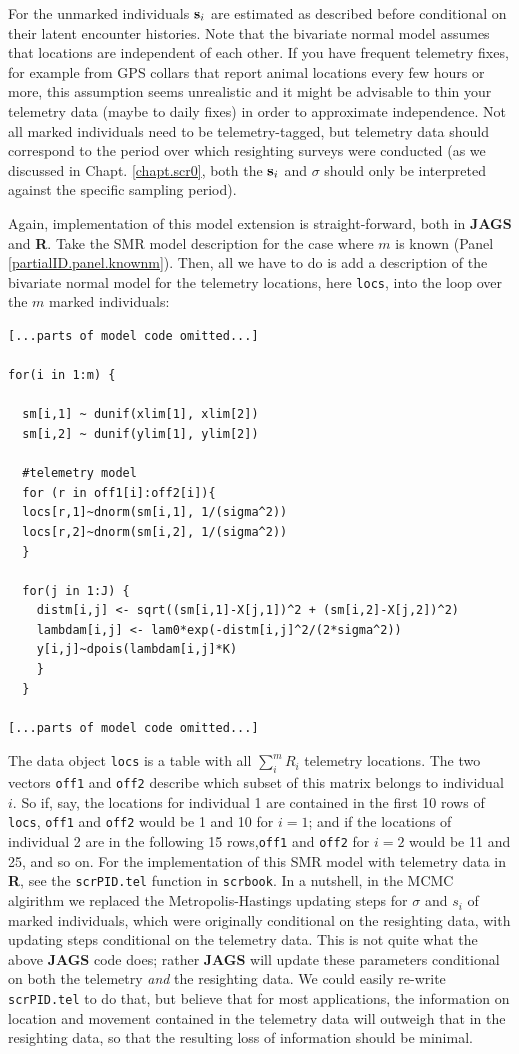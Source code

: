 For the unmarked individuals
${\bf s}_{i}$ are estimated as described before conditional on their
latent encounter histories.
Note that the bivariate normal model assumes that locations are independent of each other. If you have frequent telemetry fixes, for example from GPS collars that report animal locations every few hours or more, this assumption seems unrealistic and it might be advisable to thin your telemetry data (maybe to daily fixes) in order to approximate independence. Not all marked individuals need to be
telemetry-tagged, but telemetry data
should correspond to the period over which resighting surveys were conducted (as we discussed in Chapt. \ref{chapt.scr0}, both the ${\bf s}_i$ and $\sigma$ should only be interpreted against the specific sampling period).

Again, implementation of this model extension is straight-forward, both in {\bf JAGS} and {\bf R}. Take the SMR model description for the case where $m$ is known (Panel \ref{partialID.panel.knownm}). Then, all we have to do is add a description of the bivariate normal model for the telemetry locations, here {\tt locs}, into the loop over the $m$ marked individuals:
{\small
\begin{verbatim}
[...parts of model code omitted...]

for(i in 1:m) {

  sm[i,1] ~ dunif(xlim[1], xlim[2])
  sm[i,2] ~ dunif(ylim[1], ylim[2])

  #telemetry model
  for (r in off1[i]:off2[i]){
  locs[r,1]~dnorm(sm[i,1], 1/(sigma^2))
  locs[r,2]~dnorm(sm[i,2], 1/(sigma^2))
  }

  for(j in 1:J) {
    distm[i,j] <- sqrt((sm[i,1]-X[j,1])^2 + (sm[i,2]-X[j,2])^2)
    lambdam[i,j] <- lam0*exp(-distm[i,j]^2/(2*sigma^2))
    y[i,j]~dpois(lambdam[i,j]*K)
    }
  }

[...parts of model code omitted...]
\end{verbatim}
}
The data object {\tt locs} is a table with all $\sum_i^m R_i$ telemetry locations. The two vectors {\tt off1} and {\tt off2} describe which subset of this matrix belongs to individual $i$. So if, say, the locations for individual 1 are contained in the first 10 rows of {\tt locs}, {\tt off1} and {\tt off2} would be 1 and 10 for $i=1$; and if the locations of individual 2 are in the following 15 rows,{\tt off1} and {\tt off2} for $i=2$ would be 11 and 25, and so on. For the implementation of this SMR model with telemetry data in {\bf R}, see the {\tt scrPID.tel} function in {\tt scrbook}. In a nutshell, in the MCMC algirithm we replaced the Metropolis-Hastings updating steps for $\sigma$ and $s_i$ of marked individuals, which were originally conditional on the resighting data, with updating steps conditional on the telemetry data. This is not quite what the above {\bf JAGS} code does; rather {\bf JAGS} will update these parameters conditional on both the telemetry \emph{and} the resighting data. We could easily re-write {\tt scrPID.tel} to do that, but believe that for most applications, the information on location and movement contained in the telemetry data will outweigh that in the resighting data, so that the resulting loss of information should be minimal.

